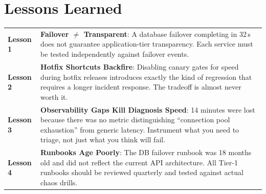 \section{Lessons Learned}

\begin{infobox}
\setlength{\parskip}{0pt}
\begin{tabularx}{\linewidth}{@{}>{\bfseries\small\color{accent}}l@{\hspace{6mm}}>{\small\raggedright\arraybackslash}X@{}}
Lesson 1 & \textbf{Failover $\neq$ Transparent}: A database failover completing in 32\,s
            does not guarantee application-tier transparency. Each service must be tested
            independently against failover events.\\[4pt]
Lesson 2 & \textbf{Hotfix Shortcuts Backfire}: Disabling canary gates for speed during
            hotfix releases introduces exactly the kind of regression that requires a longer
            incident response. The tradeoff is almost never worth it.\\[4pt]
Lesson 3 & \textbf{Observability Gaps Kill Diagnosis Speed}: 14 minutes were lost because
            there was no metric distinguishing ``connection pool exhaustion'' from generic
            latency. Instrument what you need to triage, not just what you think will
            fail.\\[4pt]
Lesson 4 & \textbf{Runbooks Age Poorly}: The DB failover runbook was 18 months old and
            did not reflect the current API architecture. All Tier-1 runbooks should be
            reviewed quarterly and tested against actual chaos drills.\\
\end{tabularx}
\setlength{\parskip}{4pt plus 1pt}
\end{infobox}

